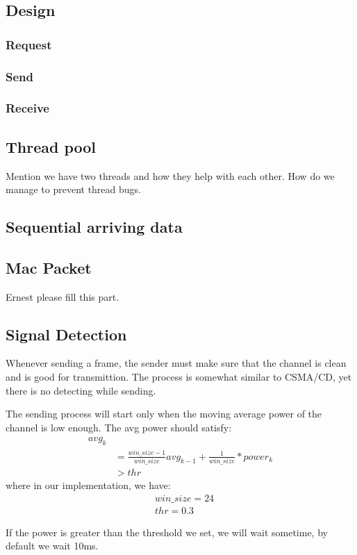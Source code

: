 \documentclass[conference,compsoc]{IEEEtran}
\begin{document}
	\subsection{Design}
		\subsubsection{Request}
		\subsubsection{Send}
		\subsubsection{Receive}

	\subsection{Thread pool}
		Mention we have two threads and how they help with each other.
		How do we manage to prevent thread bugs.
	
	\subsection{Sequential arriving data}
	
	\subsection{Mac Packet}
		Ernest please fill this part.
	
	\subsection{Signal Detection}
		Whenever sending a frame, the sender must make sure that the channel is clean and is good for transmittion.
		The process is somewhat similar to CSMA/CD, yet there is no detecting while sending.
		\par
		The sending process will start only when the moving average power of the channel is low enough. The avg power should satisfy:
		\begin{equation}\begin{aligned}
		avg_k \\
		& = 
			\frac{win\_size-1}{win\_size}avg_{k-1} + 
			\frac{1}{win\_size} * power_k \\
		& > thr
		\end{aligned}\end{equation}
		where in our implementation, we have:
		\begin{equation*}\begin{aligned} 
			& win\_size = 24 \\
			& thr = 0.3 
		\end{aligned}\end{equation*}
		\par
		If the power is	greater than the threshold we set, we will wait sometime, by default we wait 10ms.
\end{document}
